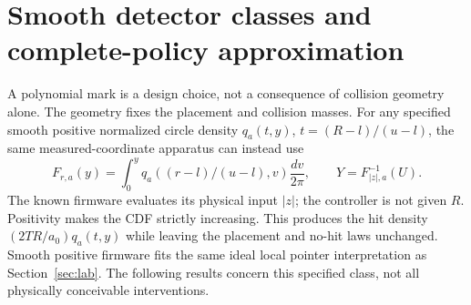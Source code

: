 \section{Smooth detector classes and complete-policy approximation}\label{sec:robust}
A polynomial mark is a design choice, not a consequence of collision
geometry alone. The geometry fixes the placement and collision masses.
For any specified smooth positive normalized circle density $q_a(t,y)$,
$t=(R-l)/(u-l)$, the same measured-coordinate apparatus can instead use
\[
 F_{r,a}(y)=\int_0^y q_a((r-l)/(u-l),v)\frac{dv}{2\pi},
 \qquad Y=F_{|z|,a}^{-1}(U).
\]
The known firmware evaluates its physical input $|z|$; the controller is
not given $R$. Positivity makes the CDF strictly increasing. This produces
the hit density $(2TR/a_0)q_a(t,y)$ while leaving the placement and no-hit
laws unchanged. Smooth positive firmware fits the same ideal local pointer
interpretation as Section~\ref{sec:lab}. The following results concern this
specified class, not all physically conceivable interventions.

